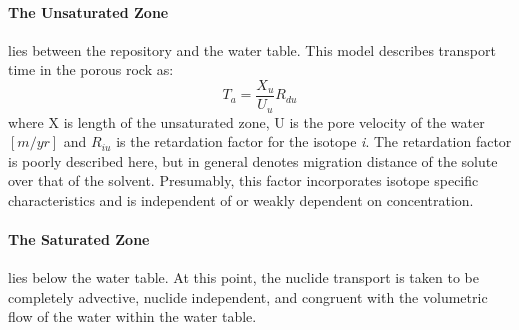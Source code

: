 \paragraph{The Unsaturated Zone} lies between the repository and the water
table. This model describes transport time in the porous rock as:
\begin{equation} T_a= \frac{X_u}{U_u}R_{du} \end{equation} where X is length of
the unsaturated zone, U is the pore velocity of the water $[m/yr]$ and $R_{iu}$
is the retardation factor for the isotope \emph{i}. The retardation factor is
poorly described here, but in general denotes migration distance of the solute
over that of the solvent. Presumably, this factor incorporates isotope specific
characteristics and is independent of or weakly dependent on concentration.  

\paragraph{The Saturated Zone} lies below the water table. At this point, the
nuclide transport is taken to be completely advective, nuclide independent, and
congruent with the volumetric flow of the water within the water table. 















